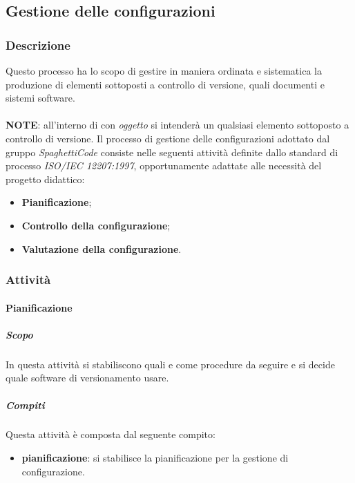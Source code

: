 \subsection{Gestione delle configurazioni}
\label{sub:gestione_configurazioni}

\subsubsection{Descrizione}
\label{ssub:gestione_configurazione:descrizione}

Questo processo ha lo scopo di gestire in maniera ordinata e sistematica la produzione di elementi sottoposti a controllo di versione,
quali documenti e sistemi software.
\\
\\
\textbf{NOTE}: all'interno di  con \emph{oggetto} si intenderà un qualsiasi elemento sottoposto a
controllo di versione.
\label{par:gestione_configurazione:compiti}
Il processo di gestione delle configurazioni adottato dal gruppo \emph{SpaghettiCode} consiste nelle seguenti attività definite dallo standard di processo \emph{ISO/IEC 12207:1997}, opportunamente adattate alle necessità del progetto didattico:
\begin{itemize}
    \item \textbf{Pianificazione};
    \item \textbf{Controllo della configurazione};
    \item \textbf{Valutazione della configurazione}.
\end{itemize}

\subsubsection{Attività}

\paragraph{Pianificazione}
\label{par:pianificazione}
\subparagraph{Scopo}
\label{par:pianificazione:scopo}
In questa attività si stabiliscono quali e come procedure da seguire e si decide quale software di versionamento usare.
\subparagraph{Compiti}
\label{par:pianificazione:compiti}
Questa attività è composta dal seguente compito:
\begin{itemize}
    \item \textbf{pianificazione}: si stabilisce la pianificazione per la gestione di configurazione.
\end{itemize}

